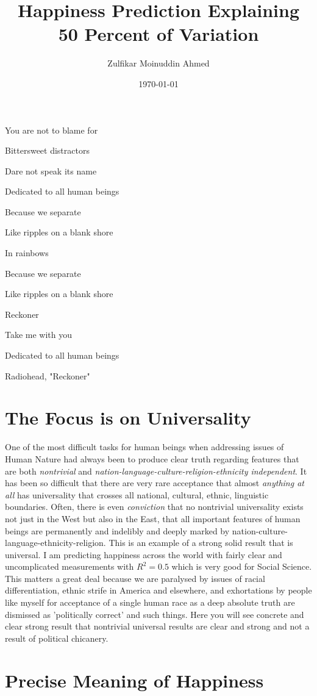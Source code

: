 \documentclass{amsart}
\title{Happiness Prediction Explaining 50 Percent of Variation}
\author{Zulfikar Moinuddin Ahmed}
\date{\today}
\begin{document}
\maketitle
\epigraph{You are not to blame for

Bittersweet distractors

Dare not speak its name

Dedicated to all human beings

Because we separate

Like ripples on a blank shore

In rainbows

Because we separate

Like ripples on a blank shore

Reckoner

Take me with you

Dedicated to all human beings}{Radiohead, "Reckoner"}

\section{The Focus is on Universality}

One of the most difficult tasks for human beings when addressing issues of Human Nature had always been to produce clear truth regarding features that are both {\em nontrivial} and {\em nation-language-culture-religion-ethnicity independent}.  It has been so difficult that there are very rare acceptance that almost {\em anything at all} has universality that crosses all national, cultural, ethnic, linguistic boundaries.  Often, there is even {\em conviction} that no nontrivial universality exists not just in the West but also in the East, that all important features of human beings are permanently and indelibly and deeply marked by nation-culture-language-ethnicity-religion.  This is an example of a strong solid result that is universal.  I am predicting happiness across the world with fairly clear and uncomplicated measurements with $R^2=0.5$ which is very good for Social Science.  This matters a great deal because we are paralysed by issues of racial differentiation, ethnic strife in America and elsewhere, and exhortations by people like myself for acceptance of a single human race as a deep absolute truth are dismissed as 'politically correct' and such things.  Here you will see concrete and clear strong result that nontrivial universal results are clear and strong and not a result of political chicanery.


\section{Precise Meaning of Happiness}
\end{document}
